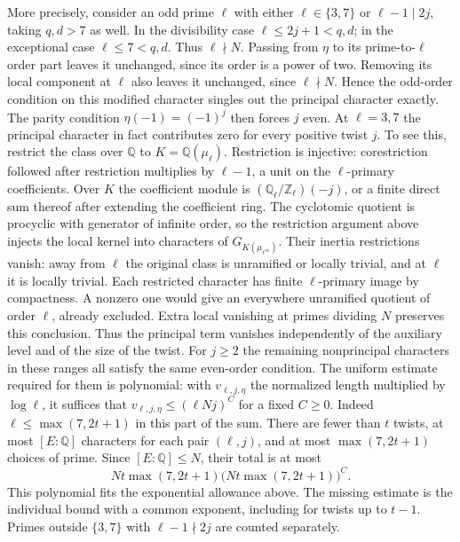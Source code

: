 \documentclass[11pt]{amsart}
\theoremstyle{definition}
\theoremstyle{remark}
\begin{document}
More precisely, consider an odd prime $\ell$ with either
$\ell\in\{3,7\}$ or $\ell-1\mid 2j$, taking $q,d>7$ as well.
In the divisibility case $\ell\le2j+1<q,d$; in the exceptional case
$\ell\le7<q,d$. Thus $\ell\nmid N$. Passing from $\eta$ to its
prime-to-$\ell$ order part leaves it unchanged, since its order is
a power of two. Removing its local component at $\ell$ also leaves it
unchanged, since $\ell\nmid N$. Hence the odd-order condition on this
modified character singles out the principal character exactly.
The parity condition $\eta(-1)=(-1)^j$ then forces $j$ even.
At $\ell=3,7$ the principal character in fact contributes zero
for every positive twist $j$. To see this, restrict the class over
$\mathbb Q$ to $K=\mathbb Q(\mu_\ell)$. Restriction is injective:
corestriction followed after restriction multiplies by $\ell-1$,
a unit on the $\ell$-primary coefficients. Over $K$ the coefficient
module is $(\mathbb Q_\ell/\mathbb Z_\ell)(-j)$, or a finite direct
sum thereof after extending the coefficient ring. The cyclotomic
quotient is procyclic with generator of infinite order, so the
restriction argument above injects the local kernel into characters
of $G_{K(\mu_{\ell^\infty})}$. Their inertia restrictions vanish:
away from $\ell$ the original class is unramified or locally trivial,
and at $\ell$ it is locally trivial. Each restricted character has
finite $\ell$-primary image by compactness. A nonzero one would
give an everywhere unramified quotient of order $\ell$, already
excluded. Extra local vanishing at primes dividing $N$ preserves
this conclusion. Thus the principal term vanishes independently of
the auxiliary level and of the size of the twist.
For $j\ge2$ the remaining nonprincipal characters in these
ranges all satisfy the same even-order condition. The uniform
estimate required for them is polynomial: with $v_{\ell,j,\eta}$
the normalized length multiplied by $\log\ell$, it suffices that
$v_{\ell,j,\eta}\le(\ell Nj)^C$ for a fixed $C\ge0$.
Indeed $\ell\le\max(7,2t+1)$ in this part of the sum. There are
fewer than $t$ twists, at most $[E:\mathbb Q]$ characters for
each pair $(\ell,j)$, and at most $\max(7,2t+1)$ choices of prime.
Since $[E:\mathbb Q]\le N$, their total is at most
\[
 Nt\max(7,2t+1)\bigl(Nt\max(7,2t+1)\bigr)^C .
\]
This polynomial fits the exponential allowance above. The missing
estimate is the individual bound with a common exponent, including
for twists up to $t-1$. Primes outside $\{3,7\}$ with
$\ell-1\nmid2j$ are counted separately.
\end{document}
